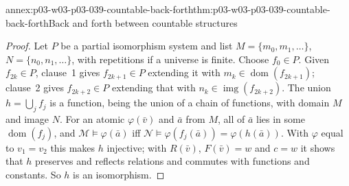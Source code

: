 \begin{annexitem}{annex:p03-w03-p03-039-countable-back-forth}{thm:p03-w03-p03-039-countable-back-forth}{Back and forth between countable structures}
\begin{proof}
Let \(P\) be a partial isomorphism system and list
\(M=\{m_0,m_1,\ldots\}\), \(N=\{n_0,n_1,\ldots\}\), with repetitions if a
universe is finite. Choose \(f_0\in P\). Given \(f_{2k}\in P\), clause~1 gives
\(f_{2k+1}\in P\) extending it with \(m_k\in\operatorname{dom}(f_{2k+1})\);
clause~2 gives \(f_{2k+2}\in P\) extending that with
\(n_k\in\operatorname{img}(f_{2k+2})\). The union \(h=\bigcup_jf_j\) is a
function, being the union of a chain of functions, with domain \(M\) and
image \(N\). For an atomic \(\varphi(\bar v)\) and \(\bar a\) from \(M\), all
of \(\bar a\) lies in some \(\operatorname{dom}(f_j)\), and
\(\mathcal M\models\varphi(\bar a)\) iff
\(\mathcal N\models\varphi(f_j(\bar a))=\varphi(h(\bar a))\). With
\(\varphi\) equal to \(v_1=v_2\) this makes \(h\) injective; with
\(R(\bar v)\), \(F(\bar v)=w\) and \(c=w\) it shows that \(h\) preserves and
reflects relations and commutes with functions and constants. So \(h\) is an
isomorphism.
\end{proof}
\end{annexitem}


